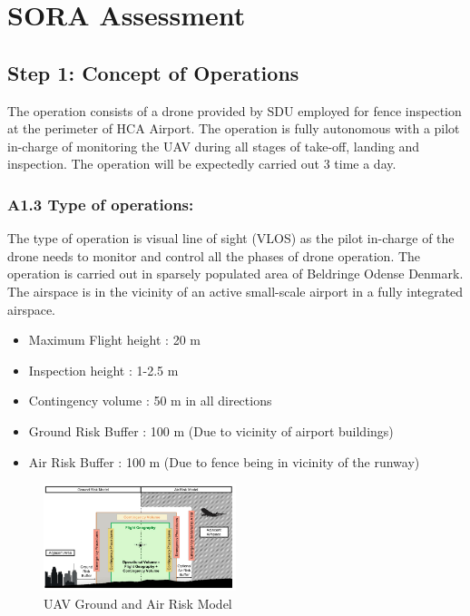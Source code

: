 \documentclass[../Head/Main.tex]{subfiles}
\begin{document}
\section{SORA Assessment}
\subsection{Step 1: Concept of Operations}
The operation consists of a drone provided by SDU employed for fence inspection at the perimeter of HCA Airport. The operation is fully autonomous with a pilot in-charge of monitoring the UAV during all stages of take-off, landing and inspection. The operation will be expectedly carried out 3 time a day.
\subsubsection*{A1.3 Type of operations:}
The type of operation is visual line of sight (VLOS) as the pilot in-charge of the drone needs to monitor and control all the phases of drone operation. The operation is carried out in sparsely populated area of Beldringe Odense Denmark. The airspace is in the vicinity of an active small-scale airport in a fully integrated airspace.
\begin{itemize}
    \item Maximum Flight height : 20 m \vspace{-5pt}
    \item Inspection height : 1-2.5 m \vspace{-5pt}
    \item Contingency volume : 50 m in all directions \vspace{-5pt}
    \item Ground Risk Buffer : 100 m (Due to vicinity of airport buildings) \vspace{-5pt}
    \item Air Risk Buffer : 100 m (Due to fence being in vicinity of the runway)
\end{itemize}
\begin{figure}[H]
    \centering
    \includegraphics[width=0.5\textwidth]{../Figures/buffer.png}
    \caption{UAV Ground and Air Risk Model\cite{sora_doc}}
    \label{fig:sora_buff}
\end{figure}
\vspace{-10pt}
\end{document}

